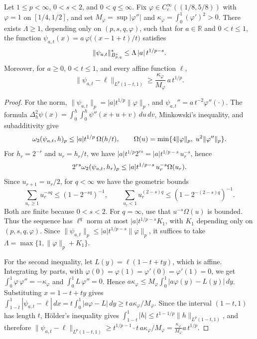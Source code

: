 \documentclass[11pt,a4paper]{article}
\begin{document}
\begin{lema}
\label{lp:lem:bump}
Let $1\le p<\infty$, $0<s<2$, and $0<q\le\infty$. Fix $\varphi\in C^\infty_c((1/8,5/8))$ with $\varphi=1$ on $[1/4,1/2]$, and set $M_\varphi=\sup|\varphi''|$ and $\kappa_\varphi=\int_0^1(\varphi')^2>0$. There exists $\Lambda\ge1$, depending only on $(p,s,q,\varphi)$, such that for $a\in\mathbb R$ and $0<t\le1$, the function $\psi_{a,t}(x)=a\,\varphi\bigl((x-1+t)/t\bigr)$ satisfies
\[
 \|\psi_{a,t}\|^*_{B^{s}_{p,q}}\le\Lambda\,|a|\,t^{1/p-s}.
\]
Moreover, for $a\ge0$, $0<t\le1$, and every affine function $\ell$,
\[
 \|\psi_{a,t}-\ell\|_{L^p(1-t,1)}\ge\frac{\kappa_\varphi}{M_\varphi}\,a\,t^{1/p}.
\]
\end{lema}

\begin{proof}
For the norm, $\|\psi_{a,t}\|_p=|a|t^{1/p}\|\varphi\|_p$, and $\psi_{a,t}''=a\,t^{-2}\varphi''(\cdot)$. The formula $\Delta_h^2\psi(x)=\int_0^h\!\int_0^h\psi''(x+u+v)\,du\,dv$, Minkowski's inequality, and subadditivity give
\[
 \omega_2(\psi_{a,t},h)_{p}\le|a|t^{1/p}\,\Omega(h/t),\qquad \Omega(u)=\min\{4\|\varphi\|_p,\;u^2\|\varphi''\|_p\}.
\]
For $h_r=2^{-r}$ and $u_r=h_r/t$, we have $|a|t^{1/p}2^{rs}=|a|t^{1/p-s}\,u_r^{-s}$, hence
\[
 2^{rs}\omega_2(\psi_{a,t},h_r)_{p}\le|a|t^{1/p-s}\,u_r^{-s}\Omega(u_r).
\]
Since $u_{r+1}=u_r/2$, for $q<\infty$ we have the geometric bounds
\[
 \sum_{u_r\ge1}u_r^{-sq}\le(1-2^{-sq})^{-1},
 \qquad \sum_{u_r<1}u_r^{(2-s)q}\le(1-2^{-(2-s)q})^{-1}.
\]
Both are finite because $0<s<2$. For $q=\infty$, use that $u^{-s}\Omega(u)$ is bounded. Thus the sequence has $\ell^q$ norm at most $|a|t^{1/p-s}K_1$, with $K_1$ depending only on $(p,s,q,\varphi)$. Since $\|\psi_{a,t}\|_p\le|a|t^{1/p-s}\|\varphi\|_p$, it suffices to take $\Lambda=\max\{1,\|\varphi\|_p+K_1\}$.

For the second inequality, let $L(y)=\ell(1-t+ty)$, which is affine. Integrating by parts, with $\varphi(0)=\varphi(1)=\varphi'(0)=\varphi'(1)=0$, we get $\int_0^1\varphi\,\varphi''=-\kappa_\varphi$ and $\int_0^1 L\,\varphi''=0$. Hence $a\kappa_\varphi\le M_\varphi\int_0^1|a\varphi(y)-L(y)|\,dy$. Substituting $x=1-t+ty$ gives $\int_{1-t}^1|\psi_{a,t}-\ell|\,dx=t\int_0^1|a\varphi-L|\,dy\ge t\,a\kappa_\varphi/M_\varphi$. Since the interval $(1-t,1)$ has length $t$, Hölder's inequality gives $\int_{1-t}^1|h|\le t^{1-1/p}\|h\|_{L^p(1-t,1)}$, and therefore $\|\psi_{a,t}-\ell\|_{L^p(1-t,1)}\ge t^{1/p-1}\cdot t\,a\kappa_\varphi/M_\varphi=\frac{\kappa_\varphi}{M_\varphi}a\,t^{1/p}$.
\end{proof}
\end{document}
